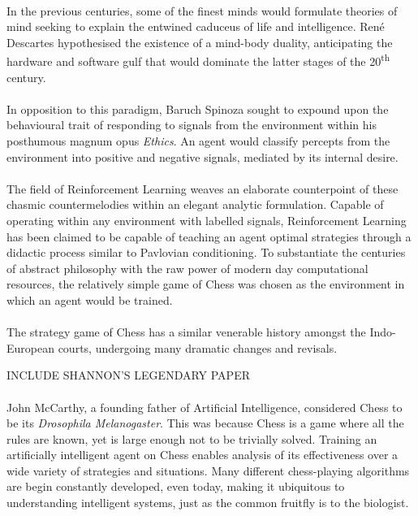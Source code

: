 \documentclass[a4paper]{book}
\begin{document}
\paragraph{} In the previous centuries, some of the finest minds would formulate theories of mind seeking to explain the entwined caduceus of life and intelligence. Ren\'e Descartes hypothesised the existence of a mind-body duality, anticipating the hardware and software gulf that would dominate the latter stages of the 20\textsuperscript{th} century.

\paragraph{} In opposition to this paradigm, Baruch Spinoza sought to expound upon the behavioural trait of responding to signals from the environment within his posthumous magnum opus \textit{Ethics}. An agent would classify percepts from the environment into positive and negative signals, mediated by its internal desire.

\paragraph{} The field of Reinforcement Learning weaves an elaborate counterpoint of these chasmic countermelodies within an elegant analytic formulation. Capable of operating within any environment with labelled signals, Reinforcement Learning has been claimed to be capable of teaching an agent optimal strategies through a didactic process similar to Pavlovian conditioning. To substantiate the centuries of abstract philosophy with the raw power of modern day computational resources, the relatively simple game of Chess was chosen as the environment in which an agent would be trained.

\paragraph{} 


\paragraph{} The strategy game of Chess has a similar venerable history amongst the Indo-European courts, undergoing many dramatic changes and revisals.

INCLUDE SHANNON'S LEGENDARY PAPER


\paragraph{}John McCarthy, a founding father of Artificial Intelligence, considered Chess to be its \textit{Drosophila Melanogaster}. \cite{drosophila} This was because Chess is a game where all the rules are known, yet is large enough not to be trivially solved. Training an artificially intelligent agent on Chess enables analysis of its effectiveness over a wide variety of strategies and situations. Many different chess-playing algorithms are begin constantly developed, even today, making it ubiquitous to understanding intelligent systems, just as the common fruitfly is to the biologist.
\end{document}
